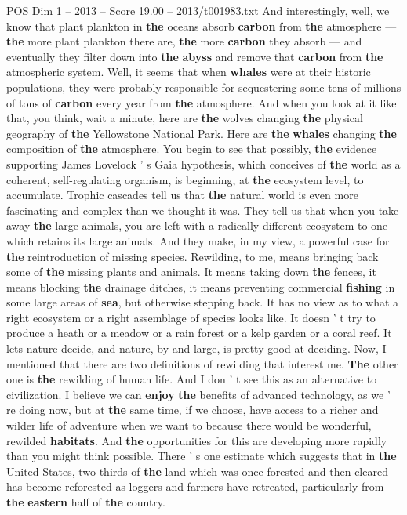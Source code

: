 \begin{textsample}{POS Dim 1 – 2013 – Score 19.00 – 2013/t001983.txt}
And interestingly, well, we know that plant plankton in \textbf{the} oceans absorb \textbf{carbon} from \textbf{the} atmosphere — \textbf{the} more plant plankton there are, \textbf{the} more \textbf{carbon} they absorb — and eventually they filter down into \textbf{the} \textbf{abyss} and remove that \textbf{carbon} from \textbf{the} atmospheric system.
Well, it seems that when \textbf{whales} were at their historic populations, they were probably responsible for sequestering some tens of millions of tons of \textbf{carbon} every year from \textbf{the} atmosphere.
And when you look at it like that, you think, wait a minute, here are \textbf{the} wolves changing \textbf{the} physical geography of \textbf{the} Yellowstone National Park.
Here are \textbf{the} \textbf{whales} changing \textbf{the} composition of \textbf{the} atmosphere.
You begin to see that possibly, \textbf{the} evidence supporting James Lovelock ' s Gaia hypothesis, which conceives of \textbf{the} world as a coherent, self-regulating organism, is beginning, at \textbf{the} ecosystem level, to accumulate.
Trophic cascades tell us that \textbf{the} natural world is even more fascinating and complex than we thought it was.
They tell us that when you take away \textbf{the} large animals, you are left with a radically different ecosystem to one which retains its large animals.
And they make, in my view, a powerful case for \textbf{the} reintroduction of missing species.
Rewilding, to me, means bringing back some of \textbf{the} missing plants and animals.
It means taking down \textbf{the} fences, it means blocking \textbf{the} drainage ditches, it means preventing commercial \textbf{fishing} in some large areas of \textbf{sea}, but otherwise stepping back.
It has no view as to what a right ecosystem or a right assemblage of species looks like.
It doesn ' t try to produce a heath or a meadow or a rain forest or a kelp garden or a coral reef.
It lets nature decide, and nature, by and large, is pretty good at deciding.
Now, I mentioned that there are two definitions of rewilding that interest me. \textbf{The} other one is \textbf{the} rewilding of human life.
And I don ' t see this as an alternative to civilization.
I believe we can \textbf{enjoy} \textbf{the} benefits of advanced technology, as we ' re doing now, but at \textbf{the} same time, if we choose, have access to a richer and wilder life of adventure when we want to because there would be wonderful, rewilded \textbf{habitats}.
And \textbf{the} opportunities for this are developing more rapidly than you might think possible.
There ' s one estimate which suggests that in \textbf{the} United States, two thirds of \textbf{the} land which was once forested and then cleared has become reforested as loggers and farmers have retreated, particularly from \textbf{the} \textbf{eastern} half of \textbf{the} country.

\end{textsample}

